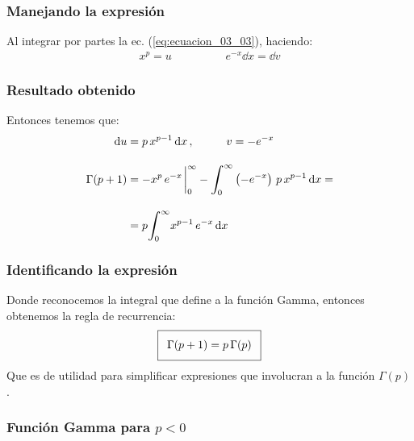 \documentclass[12pt]{beamer}
\begin{document}
\begin{frame}
\frametitle{Manejando la expresión}
Al integrar por partes la ec. (\ref{eq:ecuacion_03_03}), haciendo:
\pause
\begin{align*}
x^{p} =  u \hspace{2cm} e^{-x} \dd{x} =  \dd{v}
\end{align*}
\end{frame}
\begin{frame}
\frametitle{Resultado obtenido}
Entonces tenemos que:
\pause
\begin{align*}
\dd{u} &= p \, x^{p-1} \dd{x}, \hspace{1cm} v = - e^{-x} \\[1em]
\Gamma (p+1) &= -x^{p} \, e^{-x} \displaystyle \eval_{0}^{\infty} - \displaystyle \scaleint{6ex}_{\bs 0}^{\infty} \left(-e^{-x} \right) \, p \, x^{p-1} \dd{x} = \\[1em]
&= p \displaystyle \scaleint{6ex}_{\bs 0}^{\infty} x^{p-1} \, e^{-x} \dd{x}
\end{align*}
\end{frame}
\begin{frame}
\frametitle{Identificando la expresión}
Donde reconocemos la integral que define a la función Gamma, entonces obtenemos la regla de recurrencia:  
\pause
\begin{align}\addtolength{\fboxsep}{5pt}\boxed{
\Gamma (p + 1) = p \, \Gamma (p)}
\label{eq:ecuacion_03_04}
\end{align}
Que es de utilidad para simplificar expresiones que involucran a la función $\Gamma (p)$.
\end{frame}

\subsubsection{Función Gamma para \texorpdfstring{$p < 0$}{p < 0}}
\end{document}
